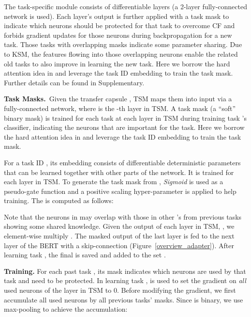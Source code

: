 \documentclass{article}
\begin{document}
The task-specific module consists of differentiable layers (a 2-layer fully-connected network is used).
Each layer's output is further applied with a task mask to indicate which neurons should be protected for that task to overcome CF and forbids gradient updates for those neurons during backpropagation for a new task. 
Those tasks with overlapping masks indicate some parameter sharing. Due to KSM, the features flowing into those overlapping neurons enable the related old tasks to also improve in learning the new task. {\color{black}Here we borrow the hard attention idea in \cite{Serra2018overcoming} and leverage the task ID embedding to train the task mask. Further details can be found in Supplementary.} 




\iffalse

\textbf{Task Masks.}~Given the transfer capsule , TSM maps them into input  via a fully-connected network, where  is the -th layer in TSM. 
A task mask (a ``soft'' binary mask)  is trained for each task  at each layer  in TSM during training task 's classifier, indicating the neurons that are important for the task. Here we borrow the 
hard attention idea in \cite{Serra2018overcoming} and leverage the task ID embedding to train the task mask.

For a task ID , its embedding  consists of differentiable deterministic parameters that can be learned together with other parts of the network. 
It is trained for each layer in TSM.
To generate the task mask  from , \textit{Sigmoid} is used as a pseudo-gate function and a positive scaling hyper-parameter  is applied to help training. The  is computed as follows:

Note that the neurons in  may overlap with those in other 's from previous tasks showing some shared knowledge. Given the output of each layer in TSM, , we element-wise multiply . The masked output of the last layer  is fed to the next layer of the BERT with a skip-connection (Figure~\ref{overview_adapter}). After learning task , the final  is saved and added to the set . 

\textbf{Training.}
For each past task , its mask  indicates which neurons are used by that task and need to be protected. In learning task ,  is used to set the gradient  on \textit{all} used neurons of the layer  in TSM to 0. Before modifying the gradient, we first accumulate all used neurons by all previous tasks' masks.
Since  is binary, we use 
max-pooling to achieve the accumulation:  
\end{document}
